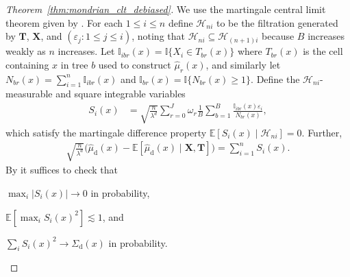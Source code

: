 \documentclass[11pt,lof]{puthesis}
\newcommand{\E}{\ensuremath{\mathbb{E}}}
\newcommand{\I}{\ensuremath{\mathbb{I}}}
\newcommand{\rd}{\ensuremath{\mathrm{d}}}
\newcommand{\bX}{\ensuremath{\mathbf{X}}}
\newcommand{\bT}{\ensuremath{\mathbf{T}}}
\newcommand{\cH}{\ensuremath{\mathcal{H}}}
\theoremstyle{break}
\theoremstyle{proof}
\newtheorem{proof}{Proof}
\begin{document}
\begin{proof}[Theorem~\ref{thm:mondrian_clt_debiased}]

  We use the martingale central limit theorem given by
  \citet[Theorem~3.2]{hall1980martingale}.
  For each $1 \leq i \leq n$ define
  $\cH_{n i}$ to be the filtration
  generated by $\bT$, $\bX$, and
  $(\varepsilon_j : 1 \leq j \leq i)$,
  noting that $\cH_{n i} \subseteq \cH_{(n+1)i}$
  because $B$ increases weakly as $n$ increases.
  Let $\I_{i b r}(x) = \I\{X_i \in T_{b r}(x)\}$
  where $T_{b r}(x)$ is the cell containing $x$ in tree $b$
  used to construct $\hat \mu_r(x)$,
  and similarly let $N_{b r}(x) = \sum_{i=1}^n \I_{i b r}(x)$
  and $\I_{b r}(x) = \I\{N_{b r}(x) \geq 1\}$.
  Define the $\cH_{n i}$-measurable and square integrable
  variables
  \begin{align*}
    S_i(x)
    &=
    \sqrt{\frac{n}{\lambda^d}}
    \sum_{r=0}^{J}
    \omega_r
    \frac{1}{B} \sum_{b=1}^B
    \frac{\I_{i b r}(x) \varepsilon_i} {N_{b r}(x)},
  \end{align*}
  which satisfy the martingale
  difference property
  $\E [ S_i(x) \mid \cH_{n i} ] = 0$.
  Further,
  \begin{align*}
    \sqrt{\frac{n}{\lambda^d}}
    \big(
      \hat\mu_\rd(x)
      - \E\left[
        \hat\mu_\rd(x) \mid \bX, \bT
      \right]
    \big)
    = \sum_{i=1}^n S_i(x).
  \end{align*}
  By \citet[Theorem~3.2]{hall1980martingale}
  it suffices to check that
  \begin{inlineroman}
    \item $\max_i |S_i(x)| \to 0$ in probability,%
      \label{it:mondrian_app_hall_prob}
    \item $\E\left[\max_i S_i(x)^2\right] \lesssim 1$, and%
      \label{it:mondrian_app_hall_exp}
    \item $\sum_i S_i(x)^2 \to \Sigma_\rd(x)$ in probability.
      \label{it:mondrian_app_hall_var}
  \end{inlineroman}


\end{proof}
\end{document}
